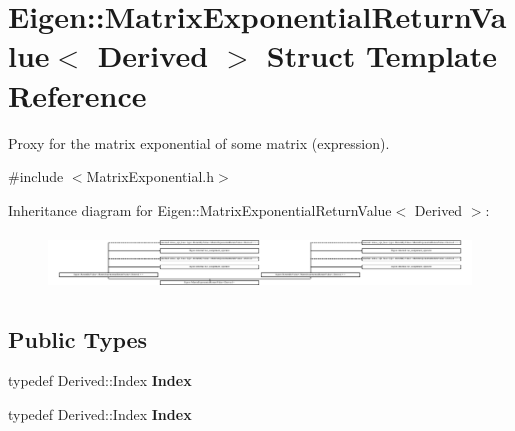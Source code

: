 \hypertarget{struct_eigen_1_1_matrix_exponential_return_value}{}\section{Eigen\+:\+:Matrix\+Exponential\+Return\+Value$<$ Derived $>$ Struct Template Reference}
\label{struct_eigen_1_1_matrix_exponential_return_value}


Proxy for the matrix exponential of some matrix (expression).  




{\ttfamily \#include $<$Matrix\+Exponential.\+h$>$}

Inheritance diagram for Eigen\+:\+:Matrix\+Exponential\+Return\+Value$<$ Derived $>$\+:\begin{figure}[H]
\begin{center}
\leavevmode
\includegraphics[height=1.492007cm]{struct_eigen_1_1_matrix_exponential_return_value}
\end{center}
\end{figure}
\subsection*{Public Types}
\begin{DoxyCompactItemize}
\item 
\mbox{\label{struct_eigen_1_1_matrix_exponential_return_value_a1ed14d884b1e3551a5b468afa415ff72}} 
typedef Derived\+::\+Index {\bfseries Index}
\item 
\mbox{\label{struct_eigen_1_1_matrix_exponential_return_value_a1ed14d884b1e3551a5b468afa415ff72}} 
typedef Derived\+::\+Index {\bfseries Index}
\end{DoxyCompactItemize}
